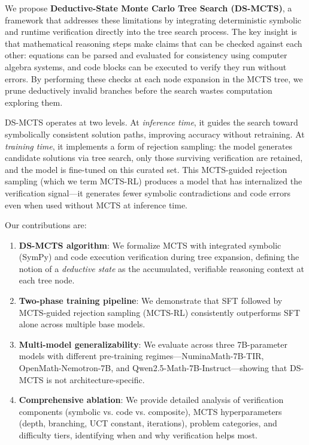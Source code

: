 \documentclass[11pt,a4paper]{article}
\begin{document}
We propose \textbf{Deductive-State Monte Carlo Tree Search (DS-MCTS)}, a
framework that addresses these limitations by integrating deterministic
symbolic and runtime verification directly into the tree search process. The
key insight is that mathematical reasoning steps make claims that can be
checked against each other: equations can be parsed and evaluated for
consistency using computer algebra systems, and code blocks can be executed to
verify they run without errors. By performing these checks at each node
expansion in the MCTS tree, we prune deductively invalid branches before the
search wastes computation exploring them.

DS-MCTS operates at two levels. At \emph{inference time}, it guides the search
toward symbolically consistent solution paths, improving accuracy without
retraining. At \emph{training time}, it implements a form of rejection sampling:
the model generates candidate solutions via tree search, only those surviving
verification are retained, and the model is fine-tuned on this curated set. This
MCTS-guided rejection sampling (which we term MCTS-RL) produces a model that
has internalized the verification signal---it generates fewer symbolic
contradictions and code errors even when used without MCTS at inference time.

Our contributions are:

\begin{enumerate}[nosep]
    \item \textbf{DS-MCTS algorithm}: We formalize MCTS with integrated symbolic
    (SymPy) and code execution verification during tree expansion, defining the
    notion of a \emph{deductive state} as the accumulated, verifiable reasoning
    context at each tree node.

    \item \textbf{Two-phase training pipeline}: We demonstrate that SFT followed
    by MCTS-guided rejection sampling (MCTS-RL) consistently outperforms SFT
    alone across multiple base models.

    \item \textbf{Multi-model generalizability}: We evaluate across three
    7B-parameter models with different pre-training regimes---NuminaMath-7B-TIR,
    OpenMath-Nemotron-7B, and Qwen2.5-Math-7B-Instruct---showing that DS-MCTS
    is not architecture-specific.

    \item \textbf{Comprehensive ablation}: We provide detailed analysis of
    verification components (symbolic vs. code vs. composite), MCTS
    hyperparameters (depth, branching, UCT constant, iterations), problem
    categories, and difficulty tiers, identifying when and why verification
    helps most.
\end{enumerate}
\end{document}
